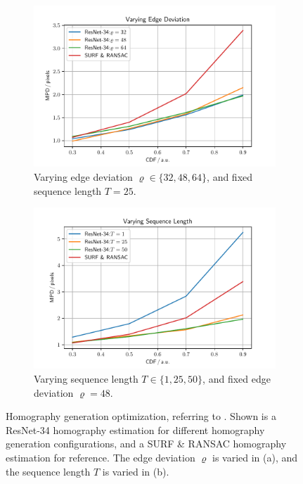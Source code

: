 \begin{figure}[tb]
\centering
\begin{subfigure}[b]{0.49\textwidth}
    \centering
    \includegraphics[width=\textwidth]{fig/frac/var_rho.pdf}
    \caption{Varying edge deviation $\varrho\in\{32,48,64\}$, and fixed sequence length $T=25$.}
    \label{c3:fig:resnet34_a}
\end{subfigure}
\begin{subfigure}[b]{0.49\textwidth}
    \centering
    \includegraphics[width=\textwidth]{fig/frac/var_seq.pdf}
    \caption{Varying sequence length $T\in\{1,25,50\}$, and fixed edge deviation $\varrho=48$.}
    \label{c3:fig:resnet34_b}
\end{subfigure}
\caption{Homography generation optimization, referring to . Shown is a ResNet-34 homography estimation for different homography generation configurations, and a SURF \& RANSAC homography estimation for reference. The edge deviation $\varrho$ is varied in (a), and the sequence length $T$ is varied in (b).}
\label{c3:fig:resnet34}
\end{figure}

